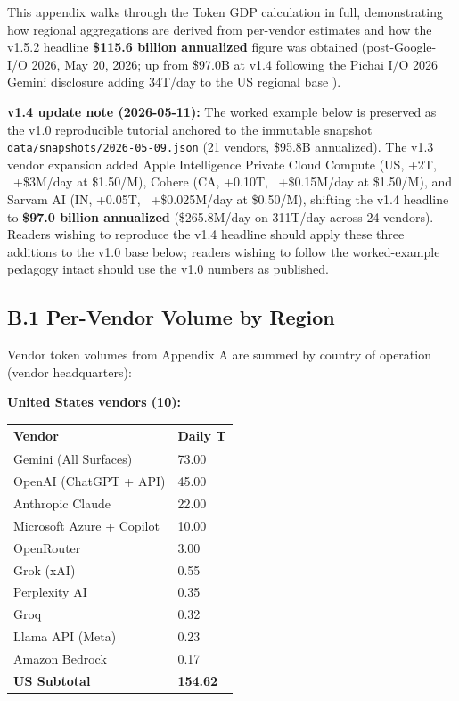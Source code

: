 \documentclass[11pt,a4paper]{article}
\begin{document}
This appendix walks through the Token GDP calculation in full, demonstrating how regional aggregations are derived from per-vendor estimates and how the v1.5.2 headline \textbf{\$115.6 billion annualized} figure was obtained (post-Google-I/O 2026, May 20, 2026; up from \$97.0B at v1.4 following the Pichai I/O 2026 Gemini disclosure adding 34T/day to the US regional base \cite{pichai2026io}).

\textbf{v1.4 update note (2026-05-11):} The worked example below is preserved as the v1.0 reproducible tutorial anchored to the immutable snapshot \texttt{data/snapshots/2026-05-09.json} (21 vendors, \$95.8B annualized). The v1.3 vendor expansion added Apple Intelligence Private Cloud Compute (US, +2T, ~+\$3M/day at \$1.50/M), Cohere (CA, +0.10T, ~+\$0.15M/day at \$1.50/M), and Sarvam AI (IN, +0.05T, ~+\$0.025M/day at \$0.50/M), shifting the v1.4 headline to \textbf{\$97.0 billion annualized} (\$265.8M/day on 311T/day across 24 vendors). Readers wishing to reproduce the v1.4 headline should apply these three additions to the v1.0 base below; readers wishing to follow the worked-example pedagogy intact should use the v1.0 numbers as published.

\subsection{B.1 Per-Vendor Volume by Region}

Vendor token volumes from Appendix A are summed by country of operation (vendor headquarters):

\textbf{United States vendors (10):}
\begin{center}
\begin{tabular}{ll}
\toprule
Vendor & Daily T \\
\midrule
Gemini (All Surfaces) & 73.00 \\
OpenAI (ChatGPT + API) & 45.00 \\
Anthropic Claude & 22.00 \\
Microsoft Azure + Copilot & 10.00 \\
OpenRouter & 3.00 \\
Grok (xAI) & 0.55 \\
Perplexity AI & 0.35 \\
Groq & 0.32 \\
Llama API (Meta) & 0.23 \\
Amazon Bedrock & 0.17 \\
\textbf{US Subtotal} & \textbf{154.62} \\
\bottomrule
\end{tabular}
\end{center}
\end{document}
